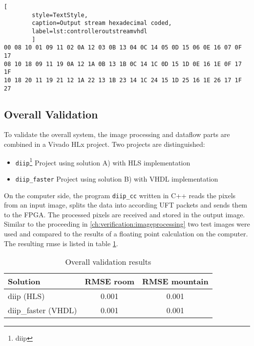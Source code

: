 \begin{minipage}{\linewidth}
    \begin{lstlisting}[
        style=TextStyle, 
        caption=Output stream hexadecimal coded, 
        label=lst:controlleroutstreamvhdl
        ]
00 08 10 01 09 11 02 0A 12 03 0B 13 04 0C 14 05 0D 15 06 0E 16 07 0F 17 
08 10 18 09 11 19 0A 12 1A 0B 13 1B 0C 14 1C 0D 15 1D 0E 16 1E 0F 17 1F
10 18 20 11 19 21 12 1A 22 13 1B 23 14 1C 24 15 1D 25 16 1E 26 17 1F 27\end{lstlisting}
\end{minipage}

%
%
\subsection{Overall Validation}\label{ch:verification:overallvalidation}
To validate the overall system, the image processing and dataflow parts are
combined in a Vivado HLx project. Two projects are distinguished:
\begin{itemize}
    \item \texttt{diip}\footnote{\Gls{diip}} Project using solution A) with HLS
    implementation
    \item \texttt{diip\_faster} Project using solution B) with VHDL
    implementation
\end{itemize}

On the computer side, the program \texttt{diip\_cc} written in C++ reads the
pixels from an input image, splits the data into according UFT packets and sends
them to the FPGA. The processed pixels are received and stored in the output
image. Similar to the proceeding in \ref{ch:verification:imageprocessing} two
test images were used and compared to the results of a floating point
calculation on the computer. The resulting \gls{rmse} is listed in table \ref{tab:overallvalidationresults}. 

\begin{table}[tb!]
    \centering
    \begin{tabular}{l c c}
        \toprule
        Solution & RMSE room & RMSE mountain \\
        \midrule
        diip (HLS) & 0.001 & 0.001 \\
        diip\_faster (VHDL) & 0.001 & 0.001 \\
        \bottomrule
    \end{tabular}
    \caption{Overall validation results}
    \label{tab:overallvalidationresults}
\end{table}


